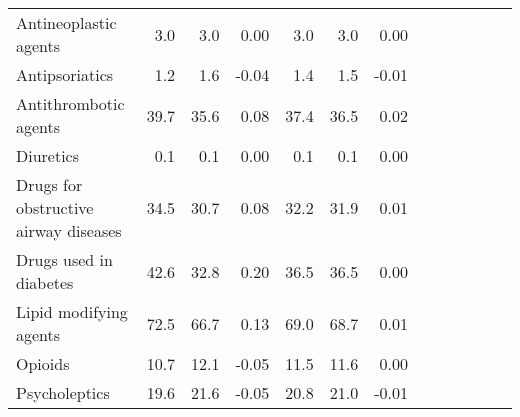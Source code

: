\documentclass[11pt,]{article}
\begin{document}
\begin{longtable}{lrrrrrrrrrrrr}
      Antineoplastic agents &  3.0 &  3.0 &  0.00 &  3.0 &  3.0 &  0.00 \\ 
      Antipsoriatics &  1.2 &  1.6 & -0.04 &  1.4 &  1.5 & -0.01 \\ 
      Antithrombotic agents & 39.7 & 35.6 &  0.08 & 37.4 & 36.5 &  0.02 \\ 
      Diuretics &  0.1 &  0.1 &  0.00 &  0.1 &  0.1 &  0.00 \\ 
      Drugs for obstructive airway diseases & 34.5 & 30.7 &  0.08 & 32.2 & 31.9 &  0.01 \\ 
      Drugs used in diabetes & 42.6 & 32.8 &  0.20 & 36.5 & 36.5 &  0.00 \\ 
      Lipid modifying agents & 72.5 & 66.7 &  0.13 & 69.0 & 68.7 &  0.01 \\ 
      Opioids & 10.7 & 12.1 & -0.05 & 11.5 & 11.6 &  0.00 \\ 
      Psycholeptics & 19.6 & 21.6 & -0.05 & 20.8 & 21.0 & -0.01 \\ 
   \bottomrule\end{longtable}
\clearpage
{}
\end{document}
